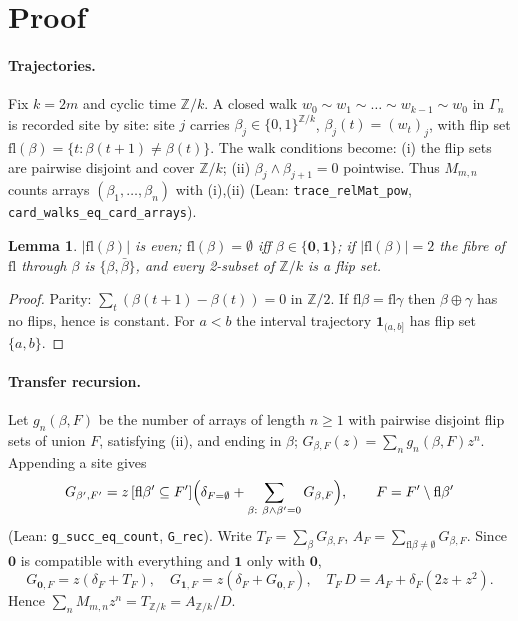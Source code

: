 \documentclass[10pt,a4paper]{article}
\newtheorem{lemma}[theorem]{Lemma}
\theoremstyle{remark}\newtheorem{remark}[theorem]{Remark}
\begin{document}
\section{Proof}
\paragraph{Trajectories.} Fix $k=2m$ and cyclic time $\mathbb Z/k$. A closed walk $w_0\sim w_1\sim\dots\sim w_{k-1}\sim w_0$ in $\Gamma_n$ is recorded site by site: site $j$ carries $\beta_j\in\{0,1\}^{\mathbb Z/k}$, $\beta_j(t)=(w_t)_j$, with flip set $\mathrm{fl}(\beta)=\{t:\beta(t+1)\ne\beta(t)\}$. The walk conditions become: (i) the flip sets are pairwise disjoint and cover $\mathbb Z/k$; (ii) $\beta_j\wedge\beta_{j+1}=0$ pointwise. Thus $M_{m,n}$ counts arrays $(\beta_1,\dots,\beta_n)$ with (i),(ii) (Lean: \texttt{trace\_relMat\_pow}, \texttt{card\_walks\_eq\_card\_arrays}).

\begin{lemma}\label{lem:flip} $|\mathrm{fl}(\beta)|$ is even; $\mathrm{fl}(\beta)=\emptyset$ iff $\beta\in\{\mathbf0,\mathbf1\}$; if $|\mathrm{fl}(\beta)|=2$ the fibre of $\mathrm{fl}$ through $\beta$ is $\{\beta,\bar\beta\}$, and every 2-subset of $\mathbb Z/k$ is a flip set.\end{lemma}
\begin{proof} Parity: $\sum_t(\beta(t+1)-\beta(t))=0$ in $\mathbb Z/2$. If $\mathrm{fl}\beta=\mathrm{fl}\gamma$ then $\beta\oplus\gamma$ has no flips, hence is constant. For $a<b$ the interval trajectory $\mathbf 1_{(a,b]}$ has flip set $\{a,b\}$.\end{proof}

\paragraph{Transfer recursion.} Let $g_n(\beta,F)$ be the number of arrays of length $n\ge1$ with pairwise disjoint flip sets of union $F$, satisfying (ii), and ending in $\beta$; $G_{\beta,F}(z)=\sum_ng_n(\beta,F)z^n$. Appending a site gives
\[G_{\beta',F'}=z\,[\mathrm{fl}\beta'\subseteq F']\Bigl(\delta_{F=\emptyset}+\sum_{\beta:\ \beta\wedge\beta'=0}G_{\beta,F}\Bigr),\qquad F=F'\setminus\mathrm{fl}\beta'\]
(Lean: \texttt{g\_succ\_eq\_count}, \texttt{G\_rec}). Write $T_F=\sum_\beta G_{\beta,F}$, $A_F=\sum_{\mathrm{fl}\beta\neq\emptyset}G_{\beta,F}$. Since $\mathbf0$ is compatible with everything and $\mathbf 1$ only with $\mathbf0$,
\[G_{\mathbf0,F}=z(\delta_F+T_F),\quad G_{\mathbf1,F}=z(\delta_F+G_{\mathbf0,F}),\quad T_F\,D=A_F+\delta_F(2z+z^2).\]
Hence $\sum_nM_{m,n}z^n=T_{\mathbb Z/k}=A_{\mathbb Z/k}/D$.
\end{document}
